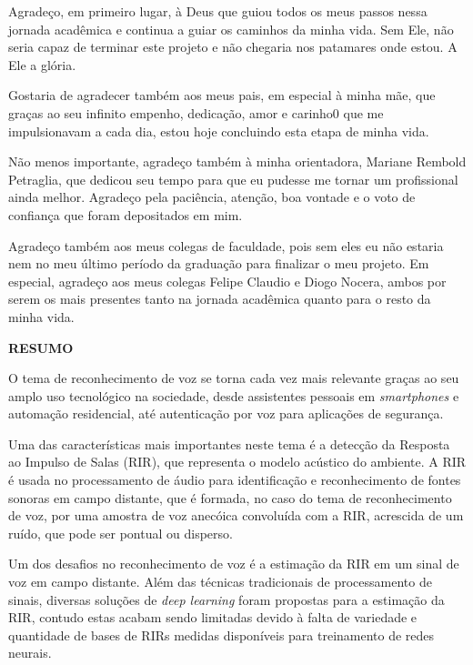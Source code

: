 Agradeço, em primeiro lugar, à Deus que guiou todos os meus passos nessa jornada acadêmica e continua a guiar os caminhos da minha vida.
Sem Ele, não seria capaz de terminar este projeto e não chegaria nos patamares onde estou. A Ele a glória.

Gostaria de agradecer também aos meus pais, em especial à minha mãe, que graças ao seu infinito empenho, dedicação, amor e carinho0 que me impulsionavam
a cada dia, estou hoje concluindo esta etapa de minha vida.

Não menos importante, agradeço também à minha orientadora, Mariane Rembold Petraglia, que dedicou seu tempo para que eu pudesse me tornar um profissional
ainda melhor. Agradeço pela paciência, atenção, boa vontade e o voto de confiança que foram depositados em mim.

Agradeço também aos meus colegas de faculdade, pois sem eles eu não estaria nem no meu último período da graduação para finalizar o meu projeto.
Em especial, agradeço aos meus colegas Felipe Claudio e Diogo Nocera, ambos por serem os mais presentes tanto na jornada acadêmica quanto para 
o resto da minha vida.

\pagebreak

\begin{center}
\textbf{RESUMO}
\end{center}
      \vspace{0.5cm}

O tema de reconhecimento de voz se torna cada vez mais relevante graças ao seu amplo uso tecnológico na sociedade, desde 
assistentes pessoais em \textit{smartphones} e automação residencial, até autenticação por voz para aplicações de segurança.

Uma das características mais importantes neste tema é a detecção da Resposta ao Impulso de Salas (RIR), que representa
o modelo acústico do ambiente. A RIR é usada no processamento de áudio para identificação e reconhecimento de fontes sonoras em campo
distante, que é formada, no caso do tema de reconhecimento de voz, por uma amostra de voz anecóica convoluída com a RIR, acrescida de um ruído,
que pode ser pontual ou disperso.

Um dos desafios no reconhecimento de voz é a estimação da RIR em um sinal de voz em campo distante.
Além das técnicas tradicionais de processamento de sinais, diversas soluções de \textit{deep learning} foram propostas para a estimação da RIR,
contudo estas acabam sendo limitadas devido à falta de variedade e quantidade de bases de RIRs medidas
disponíveis para treinamento de redes neurais.

